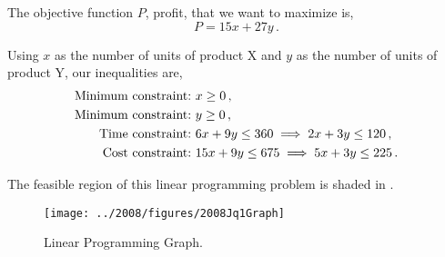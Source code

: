 %
%

\begin{subquestions}
	

\subquestion

The objective function $P$, profit, that we want to maximize is,
\begin{equation}
	P=15x + 27y \,. 
\end{equation}

Using $x$ as the number of units of product X and $y$ as the number of units of product Y, our inequalities are,
\begin{align}
	\text{Minimum constraint:} \ & x \geq 0 \,, \nonumber \\
	\text{Minimum constraint:} \ & y \geq 0 \,, \nonumber \\
	\text{Time constraint:} \ & 6x + 9y \leq 360 \implies 2x + 3y \leq 120 \,, \nonumber \\
	\text{Cost constraint:} \ & 15x + 9y \leq 675 \implies 5x + 3y \leq 225 \,.
\end{align}


\subquestion

The feasible region of this linear programming problem is shaded in .

\begin{center}

\begin{figure}[H]
	\begin{center}
		\texttt{[image: ../2008/figures/2008Jq1Graph]}
		\caption{\label{2008J:q1:fig:Graph} Linear Programming Graph.}
	\end{center}
\end{figure}


\end{center}
\end{subquestions}
